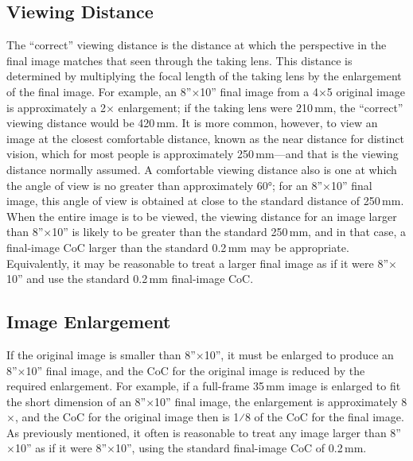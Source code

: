 \documentclass[11pt, oneside]{scrartcl}   	%
\begin{document}
\subsection{Viewing Distance}

The ``correct'' viewing distance is the distance at which the perspective in the final image matches that seen through the taking lens. This distance is determined by multiplying the focal length of the taking lens by the enlargement of the final image. For example, an 8''$\times$10'' final image from a 4$\times$5 original image is approximately a 2$\times$ enlargement; if the taking lens were 210\,mm, the “correct” viewing distance would be 420\,mm.
It is more common, however, to view an image at the closest comfortable distance, known as the near distance for distinct vision, which for most people is approximately 250\,mm—and that is the viewing distance normally assumed.
A comfortable viewing distance also is one at which the angle of view is no greater than approximately 60°; for an 8''$\times$10'' final image, this angle of view is obtained at close to the standard distance of 250\,mm. When the entire image is to be viewed, the viewing distance for an image larger than 8''$\times$10'' is likely to be greater than the standard 250\,mm, and in that case, a final-image CoC larger than the standard 0.2\,mm may be appropriate. Equivalently, it may be reasonable to treat a larger final image as if it were 8''$\times$10'' and use the standard
0.2\,mm final-image CoC.

\subsection{Image Enlargement}

If the original image is smaller than 8''$\times$10'', it must be enlarged to produce an 8''$\times$10'' final image, and the CoC for the original image is reduced by the required enlargement. For example, if a full-frame 35\,mm image is enlarged to fit the short dimension of an 8''$\times$10'' final image, the enlargement is approximately 8$\times$, and the CoC for the original image then is 1⁄8 of the CoC for the final image. As previously mentioned, it often is reasonable to treat any image larger than 8''$\times$10'' as if it were 8''$\times$10'', using the standard final-image CoC of 0.2\,mm.
\end{document}
